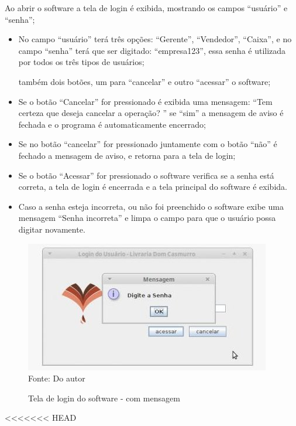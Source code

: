 Ao abrir o software a tela de login é exibida, mostrando os campos “usuário” e “senha”;
 
\begin {itemize} 

\item No campo “usuário” terá três opções: “Gerente”, “Vendedor”, “Caixa”, e no campo “senha” terá que ser digitado: “empresa123”, essa senha é utilizada por todos os três tipos de usuários;

\itemHavendo também  dois botões, um para “cancelar” e outro “acessar” o software;

\item Se o botão “Cancelar” for pressionado é exibida uma mensagem: “Tem certeza que deseja cancelar a operação? ” se “sim” a mensagem de aviso é fechada e o programa é automaticamente encerrado;

\item Se no botão “cancelar” for pressionado juntamente com o botão “não” é fechado a mensagem de aviso, e retorna para a tela de login;

\item Se o botão “Acessar” for pressionado o software verifica se a senha está correta, a tela de login é encerrada e a tela principal do software é exibida. 

\item Caso a senha esteja incorreta, ou não foi preenchido o software exibe uma mensagem “Senha incorreta” e limpa o campo para que o usuário possa digitar novamente.
\end{itemize}


\begin{figure}[H]
	\centering 
	\caption{Tela de login do software - com mensagem}
	\label{login software}
	\includegraphics[scale = 0.8]{imagens/tela-login-senha.jpg}
	\\Fonte: Do autor
\end{figure}

<<<<<<< HEAD

